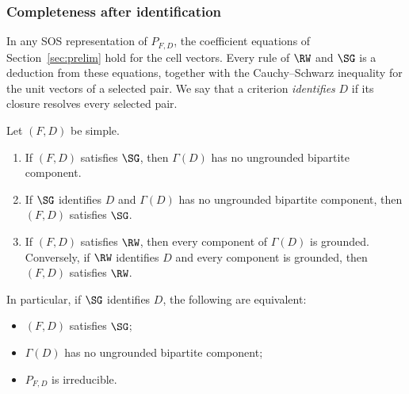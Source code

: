 \subsubsection{Completeness after identification}

In any SOS representation of $P_{F,D}$, the coefficient equations of
Section~\ref{sec:prelim} hold for the cell vectors. Every rule of $\RW$
and $\SG$ is a deduction from these equations, together with the
Cauchy--Schwarz inequality for the unit vectors of a selected pair. We say that a criterion
\emph{identifies} $D$ if its closure resolves every selected pair.

\begin{theorem}\label{thm:orthogonality-completeness}
Let $(F,D)$ be simple.
\begin{enumerate}[label=(\alph*)]
\item If $(F,D)$ satisfies $\SG$, then $\Gamma(D)$ has no ungrounded
      bipartite component.
\item If $\SG$ identifies $D$ and $\Gamma(D)$ has no ungrounded bipartite
      component, then $(F,D)$ satisfies $\SG$.
\item If $(F,D)$ satisfies $\RW$, then every component of $\Gamma(D)$ is
      grounded. Conversely, if $\RW$ identifies $D$ and every component is
      grounded, then $(F,D)$ satisfies $\RW$.
\end{enumerate}
In particular, if $\SG$ identifies $D$, the following are equivalent:
\begin{itemize}
\item $(F,D)$ satisfies $\SG$;
\item $\Gamma(D)$ has no ungrounded bipartite component;
\item $P_{F,D}$ is irreducible.
\end{itemize}
\end{theorem}

